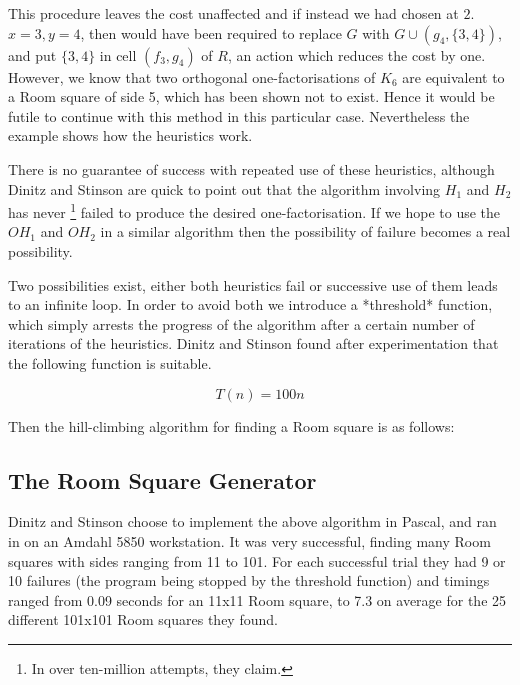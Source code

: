 \documentclass[
  11pt,
  a4paper]{book}\usepackage[]{graphicx}\usepackage[]{xcolor}
\newcounter{example}
\begin{document}
\begin{example}
This procedure leaves the cost unaffected and if instead we had
chosen at $2$. $x = 3, y = 4$, then would have been required to
replace $G$ with $G \cup (g_4,\{3,4\})$, and put $\{3, 4\}$ in
cell $(f_3, g_4)$ of $R$, an action which reduces the cost by one.
However, we know that two orthogonal one-factorisations of $K_6$
are equivalent to a Room square of side 5, which has been shown
not to exist. Hence it would be futile to continue with this
method in this particular case. Nevertheless the example shows
how the heuristics work.
\end{example}

There is no guarantee of success with repeated use of these
heuristics, although Dinitz and Stinson are quick to point out that
the algorithm involving $H_1$ and $H_2$ has never
\footnote{In over ten-million attempts, they claim.}
failed to
produce the desired one-factorisation. If we hope to use the
$OH_1$ and $OH_2$ in a similar algorithm then the possibility of
failure becomes a real possibility.

Two possibilities exist, either both heuristics fail or
successive use of them leads to an infinite loop. In order to
avoid both we introduce a *threshold* function, which simply
arrests the progress of the algorithm after a certain number of
iterations of the heuristics. Dinitz and Stinson found after
experimentation that the following function is suitable.

\begin{equation}
T(n) = 100n
\end{equation}

Then the hill-climbing algorithm for finding a Room square is as
follows:

\begin{algorithm}[H]
\end{algorithm}

\subsection{The Room Square Generator}

Dinitz and Stinson choose to implement the above algorithm in
Pascal, and ran in on an Amdahl 5850 workstation. It was very
successful, finding many Room squares with sides ranging from 11
to 101. For each successful trial they had 9 or 10 failures (the
program being stopped by the threshold function) and timings
ranged from 0.09 seconds for an 11x11 Room square, to 7.3 on
average for the 25 different 101x101 Room squares they found.
\end{document}

